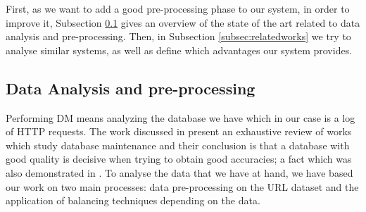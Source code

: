 \documentclass{llncs}
\begin{document}
First, as we want to add a good pre-processing phase to our system, in order to improve it, Subsection \ref{subsec:dataanalysis} gives an overview of the state of the art related to data analysis and pre-processing. Then, in Subsection \ref{subsec:relatedworks} we try to analyse similar systems, as well as define which advantages our system provides.

\subsection{Data Analysis and pre-processing}
\label{subsec:dataanalysis}

Performing DM means analyzing the database we have \cite{Frank2011}
which in our case is a log of HTTP requests. The work discussed in \cite{wilson2001maintaining} present an exhaustive review of works which
study database maintenance and their conclusion is that a database with
good quality is decisive when trying to obtain good accuracies; a fact
which was also demonstrated in \cite{zeineb2014thesis}. To analyse the
data that we have at hand, we have based our work on two main
processes: data pre-processing on
the URL dataset and the application of balancing
techniques depending on the data.
\end{document}

